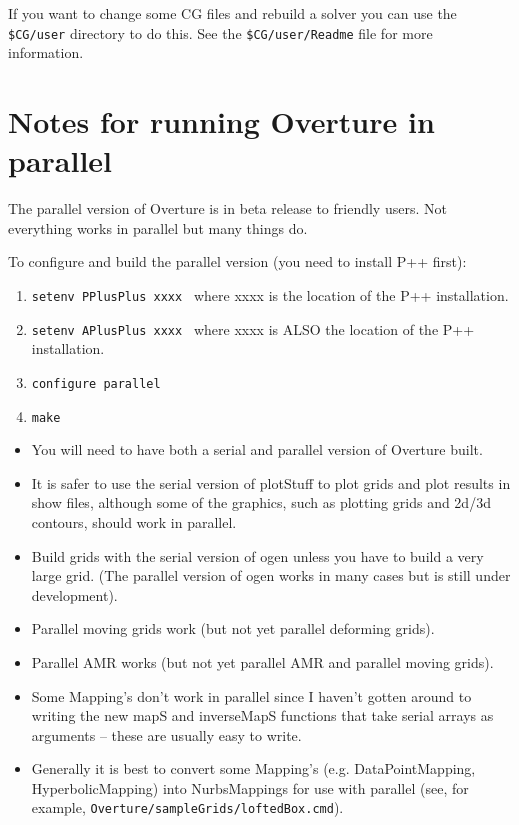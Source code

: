 \documentclass{article}
\begin{document}
If you want to change some CG files and rebuild a solver you can use the {\tt \$CG/user} directory
to do this. See the {\tt \$CG/user/Readme} file for more information.


\clearpage
\section{Notes for running Overture in parallel}


The parallel version of Overture is in beta release to friendly users. Not everything works in
parallel but many things do.

To configure and build the parallel version (you need to install P++ first):
\begin{enumerate}
  \item {\tt setenv PPlusPlus xxxx } where xxxx is the location of the P++ installation.
  \item {\tt setenv APlusPlus xxxx } where xxxx is ALSO the location of the P++ installation.
  \item {\tt configure parallel} 
  \item {\tt make} 
\end{enumerate}


\begin{itemize}
  \item You will need to have both a serial and parallel version of Overture built.
  \item It is safer to use the serial version of plotStuff to plot grids and plot results in show files, although
        some of the graphics, such as plotting grids and 2d/3d contours, should work in parallel.
  \item Build grids with the serial version of ogen unless you have to build a very large grid. (The parallel version of ogen
        works in many cases but is still under development).
  \item Parallel moving grids work (but not yet parallel deforming grids).
  \item Parallel AMR works (but not yet parallel AMR and parallel moving grids).
  \item Some Mapping's don't work in parallel since I haven't gotten around to writing the
     new mapS and inverseMapS functions that take serial arrays as arguments 
     -- these are usually easy to write. 
  \item Generally it is best to convert some Mapping's (e.g. DataPointMapping, HyperbolicMapping)
       into NurbsMappings for use with parallel (see, for example, {\tt Overture/sampleGrids/loftedBox.cmd}). 
\end{itemize}
\end{document}
